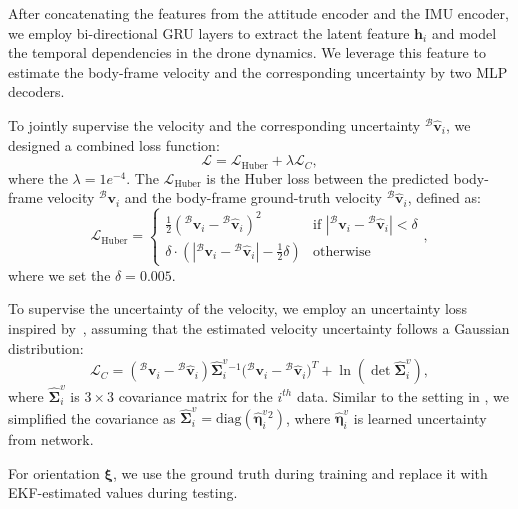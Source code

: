 After concatenating the features from the attitude encoder and the IMU encoder, we employ bi-directional GRU layers to extract the latent feature $\mathbf{h}_i$ and model the temporal dependencies in the drone dynamics. We leverage this feature to estimate the body-frame velocity and the corresponding uncertainty by two MLP decoders.

To jointly supervise the velocity and the corresponding uncertainty ${}^\mathcal{B}\hat{\mathbf{v}}_i$, we designed a combined loss function:
\begin{equation}
   \mathcal{L} = \mathcal{L}_{\text{Huber}} + \lambda \mathcal{L}_{C},
\end{equation}
where the $\lambda = 1e^{-4}$. The $\mathcal{L}_{\text{Huber}}$ is the Huber loss between the predicted body-frame velocity ${}^\mathcal{B}\mathbf{v}_i$ and the body-frame ground-truth velocity ${}^\mathcal{B}\hat{\mathbf{v}}_i$, defined as:
\begin{equation}
    \mathcal{L}_{\text{Huber}} = \begin{cases}
        \frac{1}{2}({}^\mathcal{B}\mathbf{v}_i - {}^\mathcal{B}\hat{\mathbf{v}}_i)^2 & \text{if } |{}^\mathcal{B}\mathbf{v}_i - {}^\mathcal{B}\hat{\mathbf{v}}_i| < \delta \\
        \delta \cdot \left( |{}^\mathcal{B}\mathbf{v}_i - {}^\mathcal{B}\hat{\mathbf{v}}_i| - \frac{1}{2}\delta \right) & \text{otherwise}
    \end{cases} ,
\end{equation}
where we set the $\delta = 0.005$.

To supervise the uncertainty of the velocity, we employ an uncertainty loss inspired by~\cite{liu2020tlio}, assuming that the estimated velocity uncertainty follows a Gaussian distribution:
\begin{equation}
    \mathcal{L}_{C} = ({}^\mathcal{B}\mathbf{v}_i - {}^\mathcal{B}\hat{\mathbf{v}}_i) \hat{\boldsymbol{\Sigma}}^{v}_{i}{}^{-1} {({}^\mathcal{B}\mathbf{v}_i - {}^\mathcal{B}\hat{\mathbf{v}}_i})^T +\ln (\det \hat{\boldsymbol{\Sigma}}^{v}_i),
\end{equation}
where $\hat{\boldsymbol{\Sigma}}^{v}_i$ is $3 \times 3$ covariance matrix for the $i^{th}$ data. Similar to the setting in \cite{liu2020tlio}, we simplified the covariance as  $\hat{\boldsymbol{\Sigma}}^{v}_i = \text{diag} (\hat{\boldsymbol{\eta}} ^{v}_i{}^2)$, where $\hat{\boldsymbol{\eta}} ^{v}_i$ is learned uncertainty from network.

For orientation $\boldsymbol{\xi}$, we use the ground truth during training and replace it with EKF-estimated values during testing.

